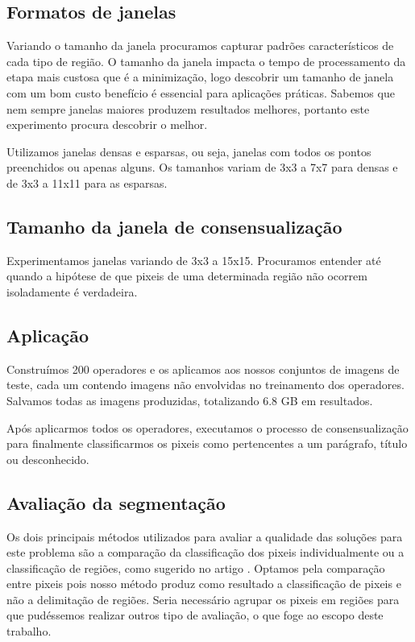 \documentclass[a4paper,11pt]{article}
\begin{document}
  \subsection{Formatos de janelas}

    Variando o tamanho da janela procuramos capturar padrões característicos de cada tipo de região. O tamanho da janela impacta o tempo de processamento da etapa mais custosa que é a minimização, logo descobrir um tamanho de janela com um bom custo benefício é essencial para aplicações práticas. Sabemos que nem sempre janelas maiores produzem resultados melhores, portanto este experimento procura descobrir o melhor.

    Utilizamos janelas densas e esparsas, ou seja, janelas com todos os pontos preenchidos ou apenas alguns. Os tamanhos variam de 3x3 a 7x7 para densas e de 3x3 a 11x11 para as esparsas.

  \subsection{Tamanho da janela de consensualização}

    Experimentamos janelas variando de 3x3 a 15x15. Procuramos entender até quando a hipótese de que pixeis de uma determinada região não ocorrem isoladamente é verdadeira.

  \subsection{Aplicação}

    Construímos 200 operadores e os aplicamos aos nossos conjuntos de imagens de teste, cada um contendo imagens não envolvidas no treinamento dos operadores. Salvamos todas as imagens produzidas, totalizando 6.8 GB em resultados.

    Após aplicarmos todos os operadores, executamos o processo de consensualização para finalmente classificarmos os pixeis como pertencentes a um parágrafo, título ou desconhecido.

  \subsection{Avaliação da segmentação}

    Os dois principais métodos utilizados para avaliar a qualidade das soluções para este problema são a comparação da classificação dos pixeis individualmente ou a classificação de regiões, como sugerido no artigo \cite{10.1109/ICDAR.2007.207}.
    Optamos pela comparação entre pixeis pois nosso método produz como resultado a classificação de pixeis e não a delimitação de regiões. Seria necessário agrupar os pixeis em regiões para que pudéssemos realizar outros tipo de avaliação, o que foge ao escopo deste trabalho.
\end{document}
